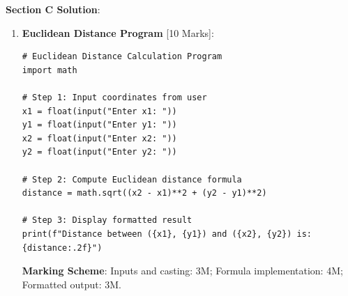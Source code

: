 \begin{solutionbox}
\noindent\textbf{Section C Solution}:
\begin{enumerate}[start=7]
    \item \textbf{Euclidean Distance Program} [10 Marks]:
\begin{lstlisting}[language=Python3]
# Euclidean Distance Calculation Program
import math

# Step 1: Input coordinates from user
x1 = float(input("Enter x1: "))
y1 = float(input("Enter y1: "))
x2 = float(input("Enter x2: "))
y2 = float(input("Enter y2: "))

# Step 2: Compute Euclidean distance formula
distance = math.sqrt((x2 - x1)**2 + (y2 - y1)**2)

# Step 3: Display formatted result
print(f"Distance between ({x1}, {y1}) and ({x2}, {y2}) is: {distance:.2f}")
\end{lstlisting}
\textbf{Marking Scheme}: Inputs and casting: 3M; Formula implementation: 4M; Formatted output: 3M.
\end{enumerate}
\end{solutionbox}
